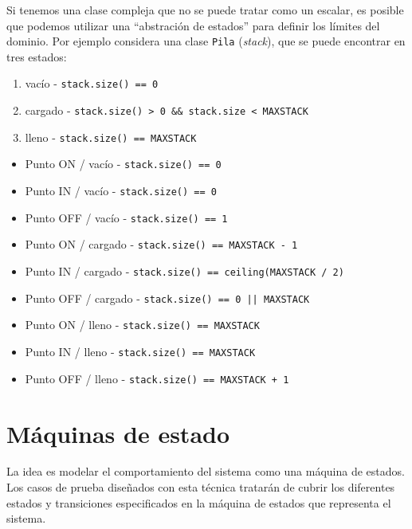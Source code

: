 Si tenemos una clase compleja que no se puede tratar como un escalar, es posible que podemos utilizar una ``abstración de estados'' para definir los límites del dominio.
Por ejemplo considera una clase \lstinline|Pila| (\textit{stack}), que se puede encontrar en tres estados:
\begin{enumerate}
   \item vacío - \lstinline|stack.size() == 0|
   \item cargado - \lstinline|stack.size() > 0 && stack.size < MAXSTACK|
   \item lleno - \lstinline|stack.size() == MAXSTACK|
\end{enumerate}

\begin{itemize}
   \item Punto ON / vacío - \lstinline|stack.size() == 0|
   \item Punto IN / vacío - \lstinline|stack.size() == 0|
   \item Punto OFF / vacío - \lstinline|stack.size() == 1|
   \item Punto ON / cargado - \lstinline|stack.size() == MAXSTACK - 1|
   \item Punto IN / cargado - \lstinline|stack.size() == ceiling(MAXSTACK / 2) |
   \item Punto OFF / cargado - \lstinline{stack.size() == 0 || MAXSTACK}
   \item Punto ON / lleno - \lstinline|stack.size() == MAXSTACK|
   \item Punto IN / lleno - \lstinline|stack.size() == MAXSTACK|
   \item Punto OFF / lleno - \lstinline|stack.size() == MAXSTACK + 1|
\end{itemize}

\section{Máquinas de estado}

La idea es modelar el comportamiento del sistema como una
máquina de estados.
Los casos de prueba diseñados con esta técnica tratarán de
cubrir los diferentes estados y transiciones especificados en la
máquina de estados que representa el sistema.

